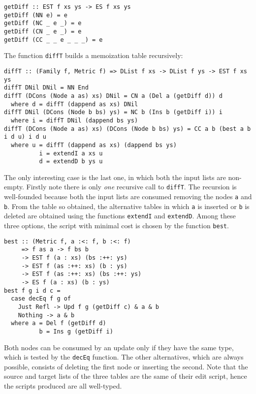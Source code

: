 \documentclass[../Thesis.tex]{subfiles}
\begin{document}
\begin{verbatim}
getDiff :: EST f xs ys -> ES f xs ys
getDiff (NN e) = e
getDiff (NC _ e _) = e
getDiff (CN _ e _) = e
getDiff (CC _ _ e _ _ _) = e
\end{verbatim}

	The function \texttt{diffT} builds a memoization table recursively:

\begin{verbatim}
diffT :: (Family f, Metric f) => DList f xs -> DList f ys -> EST f xs ys
diffT DNil DNil = NN End
diffT (DCons (Node a as) xs) DNil = CN a (Del a (getDiff d)) d 
  where d = diffT (dappend as xs) DNil
diffT DNil (DCons (Node b bs) ys) = NC b (Ins b (getDiff i)) i
  where i = diffT DNil (dappend bs ys)
diffT (DCons (Node a as) xs) (DCons (Node b bs) ys) = CC a b (best a b i d u) i d u
  where u = diffT (dappend as xs) (dappend bs ys)
          i = extendI a xs u
          d = extendD b ys u
\end{verbatim}
 
	The only interesting case is the last one, in which 
	both the input lists are non-empty.
	Firstly note there is only \emph{one} recursive call to \texttt{diffT}.
	The recursion is well-founded because both the input lists are consumed 
	removing the nodes \texttt{a} and \texttt{b}.
	From the table so obtained, the alternative tables in which 
	\texttt{a} is inserted or \texttt{b} is deleted are obtained using the functions
	\texttt{extendI} and \texttt{extendD}.
	Among these three options, the script with minimal cost is chosen
	by the function \texttt{best}.
	
\begin{verbatim}
best :: (Metric f, a :<: f, b :<: f)
     => f as a -> f bs b
     -> EST f (a : xs) (bs :++: ys)
     -> EST f (as :++: xs) (b : ys)
     -> EST f (as :++: xs) (bs :++: ys)
     -> ES f (a : xs) (b : ys)
best f g i d c = 
  case decEq f g of
    Just Refl -> Upd f g (getDiff c) & a & b
    Nothing -> a & b
  where a = Del f (getDiff d)
          b = Ins g (getDiff i)
\end{verbatim}
	
	Both nodes can be consumed by an update only if they have the 
	same type, which is tested by the \texttt{decEq} function.
 	The other alternatives, which are always possible, consists of deleting
 	the first node or inserting the second. Note that the source and target
 	lists of the three tables are the same of their edit script, hence the scripts
 	produced are all well-typed.
\end{document}

